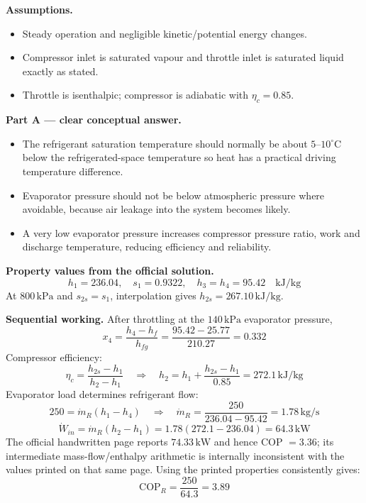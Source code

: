 \textbf{Assumptions.}
\begin{itemize}
  \item Steady operation and negligible kinetic/potential energy changes.
  \item Compressor inlet is saturated vapour and throttle inlet is saturated liquid exactly as stated.
  \item Throttle is isenthalpic; compressor is adiabatic with $\eta_c=0.85$.
\end{itemize}


\textbf{Part A --- clear conceptual answer.}
\begin{itemize}
  \item The refrigerant saturation temperature should normally be about $5$--$10^\circ\mathrm{C}$ below the refrigerated-space temperature so heat has a practical driving temperature difference.
  \item Evaporator pressure should not be below atmospheric pressure where avoidable, because air leakage into the system becomes likely.
  \item A very low evaporator pressure increases compressor pressure ratio, work and discharge temperature, reducing efficiency and reliability.
\end{itemize}

\textbf{Property values from the official solution.}
\[
h_1=236.04,\quad s_1=0.9322,\quad h_3=h_4=95.42\quad \mathrm{kJ/kg}
\]
At $800\,\mathrm{kPa}$ and $s_{2s}=s_1$, interpolation gives $h_{2s}=267.10\,\mathrm{kJ/kg}$.

\textbf{Sequential working.}
After throttling at the $140\,\mathrm{kPa}$ evaporator pressure,
\[
x_4=\frac{h_4-h_f}{h_{fg}}=\frac{95.42-25.77}{210.27}=0.332
\]
Compressor efficiency:
\[
\eta_c=\frac{h_{2s}-h_1}{h_2-h_1}
\quad\Rightarrow\quad
h_2=h_1+\frac{h_{2s}-h_1}{0.85}=272.1\,\mathrm{kJ/kg}
\]
Evaporator load determines refrigerant flow:
\[
250=\dot m_R(h_1-h_4)
\quad\Rightarrow\quad
\dot m_R=\frac{250}{236.04-95.42}=1.78\,\mathrm{kg/s}
\]
\[
\dot W_{in}=\dot m_R(h_2-h_1)=1.78(272.1-236.04)=64.3\,\mathrm{kW}
\]
The official handwritten page reports $74.33\,\mathrm{kW}$ and hence COP $=3.36$; its intermediate mass-flow/enthalpy arithmetic is internally inconsistent with the values printed on that same page. Using the printed properties consistently gives:
\[
\mathrm{COP}_R=\frac{250}{64.3}=3.89
\]

